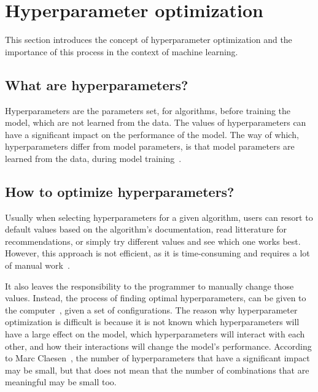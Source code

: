 \section{Hyperparameter optimization}\label{sec:hyperparam}
This section introduces the concept of hyperparameter optimization and the importance of this process in the context of machine learning. 


\subsection{What are hyperparameters?}\label{subsec:hyperparam-what}
Hyperparameters are the parameters set, for algorithms, before training the model, which are not learned from the data. The values of hyperparameters can have a significant impact on the performance of the model. The way of which, hyperparameters differ from model parameters, is that model parameters are learned from the data, during model training~\cite{probst2019tunability}.


\subsection{How to optimize hyperparameters?}\label{subsec:hyperparam-how}
 Usually when selecting hyperparameters for a given algorithm, users can resort to default values based on the algorithm's documentation, read litterature for recommendations, or simply try different values and see which one works best. However, this approach is not efficient, as it is time-consuming and requires a lot of manual work~\cite{probst2019tunability}.

It also leaves the responsibility to the programmer to manually change those values. Instead, the process of finding optimal hyperparameters, can be given to the computer~\cite{automated-machine-learning}, given a set of configurations. The reason why hyperparameter optimization is difficult is because it is not known which hyperparameters will have a large effect on the model, which hyperparameters will interact with each other, and how their interactions will change the model's performance. According to Marc Claesen~\cite{hyperparam-search}, the number of hyperparameters that have a significant impact may be small, but that does not mean that the number of combinations that are meaningful may be small too. 

